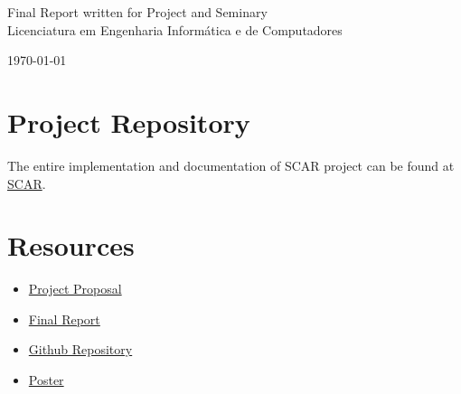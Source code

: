 \documentclass[10pt]{report}
\begin{document}
\begin{center}
\begin{large}
        \vspace{1.25cm}

        \begin{Large}
            Final Report written for Project and Seminary \\ \vspace{.25cm}
            Licenciatura em Engenharia Informática e de Computadores
        \end{Large}
    \end{large}

    \vspace{1.75cm} \today \vspace{.75cm}

\end{center}

\section{Project Repository}
The entire implementation and documentation of SCAR project can be found at \href{https://github.com/DiGo-Certify/DiGo-certify-app}{SCAR}.

\section{Resources}
\begin{itemize}
    \item \href{https://github.com/DiGo-Certify/DiGo-certify-app/tree/main/docs/project-proposal}{Project Proposal}
    \item \href{https://github.com/DiGo-Certify/DiGo-certify-app/blob/report-features/docs/final-report/report.pdf}{Final Report}
    \item \href{https://github.com/DiGo-Certify/DiGo-certify-app}{Github Repository}
    \item \href{https://github.com/DiGo-Certify/DiGo-certify-app/blob/report-features/docs/poster.pdf}{Poster}
\end{itemize}


\vspace{.75cm}



\end{document}
